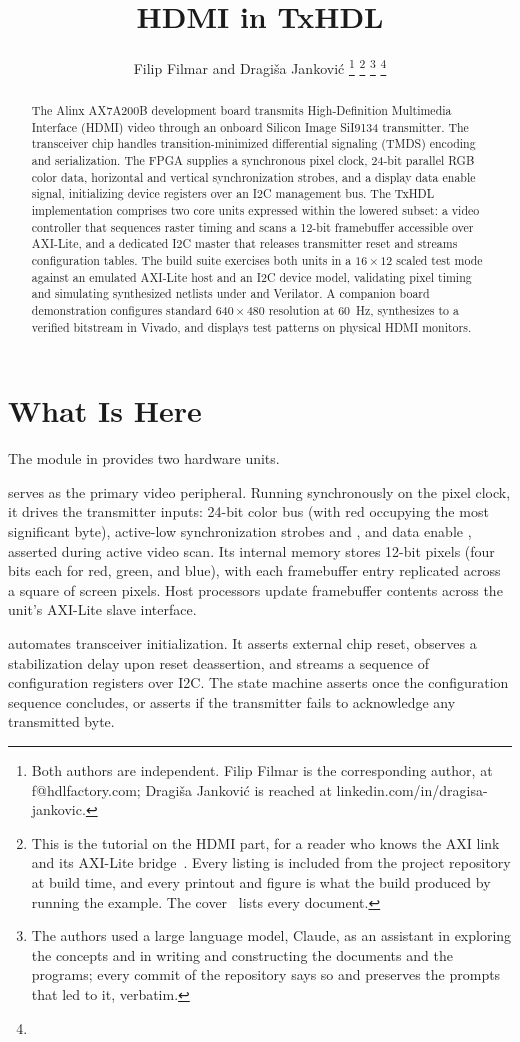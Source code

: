 \documentclass[journal,9pt]{IEEEtran}
\title{HDMI in TxHDL}
\author{Filip Filmar and Dragiša Janković%
\thanks{Both authors are independent. Filip Filmar is the
corresponding author, at f@hdlfactory.com; Dragiša Janković is
reached at linkedin.com/in/dragisa-jankovic.}%
\thanks{This is the tutorial on the HDMI part, for a reader who knows
the AXI link and its AXI-Lite bridge~\cite{axi}. Every listing is
included from the project repository \code{HDL/txhdl} at build time,
and every printout and figure is what the build produced by running
the example. The cover~\cite{cover} lists every document.}%
\thanks{The authors used a large language model, Claude, as an
assistant in exploring the concepts and in writing and constructing
the documents and the programs; every commit of the repository says
so and preserves the prompts that led to it, verbatim.}%
\thanks{\buildstamp}}
\begin{document}
\maketitle

\begin{abstract}
The Alinx AX7A200B development board transmits High-Definition Multimedia
Interface (HDMI) video through an onboard Silicon Image SiI9134
transmitter. The transceiver chip handles transition-minimized
differential signaling (TMDS) encoding and serialization. The FPGA
supplies a synchronous pixel clock, 24-bit parallel RGB color data,
horizontal and vertical synchronization strobes, and a display data enable
signal, initializing device registers over an I2C management bus. The
TxHDL implementation comprises two core units expressed within the lowered
subset: a video controller that sequences raster timing and scans a 12-bit
framebuffer accessible over AXI-Lite, and a dedicated I2C master that
releases transmitter reset and streams configuration tables. The build
suite exercises both units in a $16 \times 12$ scaled test mode against an
emulated AXI-Lite host and an I2C device model, validating pixel timing and
simulating synthesized netlists under  and Verilator. A
companion board demonstration configures standard $640 \times 480$
resolution at 60~Hz, synthesizes to a verified bitstream in Vivado, and
displays test patterns on physical HDMI monitors.
\end{abstract}

\section{What Is Here}
\label{sec:h-what}

The  module in  provides two hardware units.

 serves as the primary video peripheral. Running synchronously
on the pixel clock, it drives the transmitter inputs: 24-bit color bus
 (with red occupying the most significant byte), active-low
synchronization strobes  and , and data enable
, asserted during active video scan. Its internal memory stores
12-bit pixels (four bits each for red, green, and blue), with each
framebuffer entry replicated across a square of  screen
pixels. Host processors update framebuffer contents across the unit's
AXI-Lite slave interface.

 automates transceiver initialization. It asserts external
chip reset, observes a stabilization delay upon reset deassertion, and
streams a sequence of configuration registers over I2C. The state machine
asserts  once the configuration sequence concludes, or asserts
 if the transmitter fails to acknowledge any transmitted byte.
\end{document}
